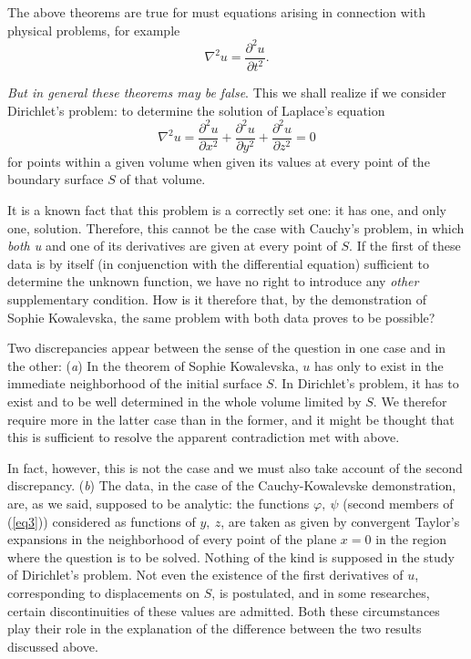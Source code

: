 \documentclass[12pt,oneside]{book}
\begin{document}
The above theorems are true for must equations arising in connection with physical problems, for example
\begin{equation}
    \tag{E}\label{E}
    \nabla^2u=\frac{\partial^2u}{\partial t^2}.
\end{equation} \par 

\textit{But in general these theorems may be false}. This we shall realize if we consider Dirichlet's problem: to determine the solution of Laplace's equation 
\begin{equation}
    \tag{e}\label{e}
    \nabla^2u=\frac{\partial^2u}{\partial x^2}+\frac{\partial^2u}{\partial y^2}+\frac{\partial^2u}{\partial z^2}=0
\end{equation}
for points within a given volume when given its values at every point of the boundary surface $S$ of that volume. \par 

It is a known fact that this problem is a correctly set one: it has one, and only one, solution. Therefore, this cannot be the case with Cauchy's problem, in which \textit{both u} and one of its derivatives are given at every point of $S$. If the first of these data is by itself (in conjuenction with the differential equation) sufficient to determine the unknown function, we have no right to introduce any \textit{other} supplementary condition. How is it therefore that, by the demonstration of Sophie Kowalevska, the same problem with both data proves to be possible? \par 

Two discrepancies appear between the sense of the question in one case and in the other: (\textit{a}) In the theorem of Sophie Kowalevska, $u$ has only to exist in the immediate neighborhood of the initial surface $S$. In Dirichlet's problem, it has to exist and to be well determined in the whole volume limited by $S$. We therefor require more in the latter case than in the former, and it might be thought that this is sufficient to resolve the apparent contradiction met with above. \par 

In fact, however, this is not the case and we must also take account of the second discrepancy. (\textit{b}) The data, in the case of the Cauchy-Kowalevske demonstration, are, as we said, supposed to be analytic: the functions $\varphi,\ \psi$ (second members of (\ref{eq3})) considered as functions of $y,\ z$, are taken as given by convergent Taylor's expansions in the neighborhood of every point of the plane $x=0$ in the region where the question is to be solved. Nothing of the kind is supposed in the study of Dirichlet's problem. Not even the existence of the first derivatives of $u$, corresponding to displacements on $S$, is postulated, and in some researches, certain discontinuities of these values are admitted. Both these circumstances play their role in the explanation of the difference between the two results discussed above. \par 
\end{document}
